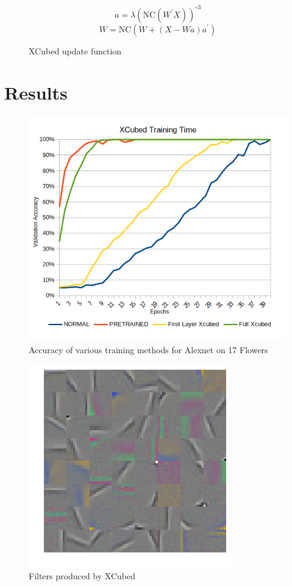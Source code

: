 \documentclass[twocolumn]{article}
\begin{document}
\begin{figure}[!htb]
\begin{equation}
    a = \lambda(\text{NC}(W^\prime X))^{\circ 3}
\end{equation}
\begin{equation}
    W = \text{NC}(W + (X-Wa)a^\prime)
\end{equation}
\caption{XCubed update function}
\label{equ:xcubedupdate}
\end{figure}





\section{Results}
\begin{figure}[!htb]
    \centering
    \includegraphics[width=.8\linewidth]{X3GRAPH}
    \caption{Accuracy of various training methods for Alexnet on 17 Flowers}
    \label{fig:netspeedup}
\end{figure}
\begin{figure}[!htb]
    \centering
    \includegraphics[width=.8\linewidth]{x3filters}
    \caption{Filters produced by XCubed}
    \label{fig:x3weights}
\end{figure}
\end{document}
